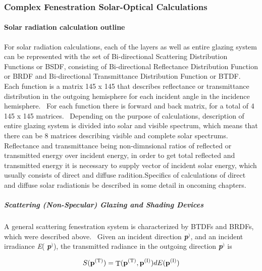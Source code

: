 \subsubsection{Complex Fenestration Solar-Optical Calculations}\label{complex-fenestration-solar-optical-calculations}

\paragraph{\texorpdfstring{\textbf{Solar radiation calculation outline}}{Solar radiation calculation outline}}\label{solar-radiation-calculation-outline}

For solar radiation calculations, each of the layers as well as entire glazing system can be represented with the set of Bi-directional Scattering Distribution Functions or BSDF, consisting of Bi-directional Reflectance Distribution Function or BRDF and Bi-directional Transmittance Distribution Function or BTDF.~ Each function is a matrix 145 x 145 that describes reflectance or transmittance distribution in the outgoing hemisphere for each incident angle in the incidence hemisphere.~ For each function there is forward and back matrix, for a total of 4 145 x 145 matrices.~ Depending on the purpose of calculations, description of entire glazing system is divided into solar and visible spectrum, which means that there can be 8 matrices describing visible and complete solar spectrums.~ Reflectance and transmittance being non-dimnsional ratios of reflected or transmitted energy over incident energy, in order to get total reflected and transmitted energy it is necessary to supply vector of incident solar energy, which usually consists of direct and diffuse radition.Specifics of calculations of direct and diffuse solar radiationis be described in some detail in oncoming chapters.

\subparagraph{\texorpdfstring{\textbf{Scattering (Non-Specular) Glazing and Shading Devices}}{Scattering (Non-Specular) Glazing and Shading Devices}}\label{scattering-non-specular-glazing-and-shading-devices}

A general scattering fenestration system is characterized by BTDFs and BRDFs, which were described above.~ Given an incident direction \textbf{\emph{p}}\(^{)}\), and an incident irradiance \emph{E}( \textbf{\emph{p}}\(^{)}\)), the transmitted radiance in the outgoing direction \textbf{\emph{p}}\(^{)}\) is

\begin{equation}
S({{\bf{p}}^{{\rm{(T)}}}}) = {\mathop{\rm T}\nolimits} ({{\bf{p}}^{{\rm{(T)}}}},{{\bf{p}}^{{\rm{(I)}}}})dE({{\bf{p}}^{{\rm{(I)}}}})
\end{equation}

